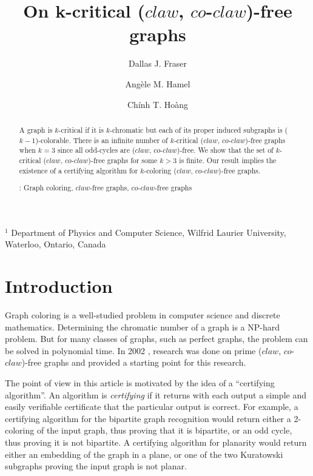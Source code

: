 \documentclass[12pt]{article}
\title{On k-critical ($claw$, $co$-$claw$)-free graphs}
\author{
  Dallas J. Fraser\inst{1}
  \and Ang\`ele M. Hamel\inst{1}
  \and Ch\'inh T. Ho\`ang\inst{1}
}
\def\inst#1{$^{#1}$}
\def\CCO{($claw$, $co$-$claw$)}
\begin{document}
\maketitle

\begin{center}
{\footnotesize

\inst{1} Department of Physics and Computer Science, Wilfrid Laurier
University, \\ Waterloo, Ontario, Canada}


\end{center}
%
\begin{abstract}
A graph is $k$-critical if it is $k$-chromatic but each of its proper
induced subgraphs is ($k-1$)-colorable. There is an infinite number of $k$-critical {\CCO}-free graphs when $k = 3$ since all odd-cycles are {\CCO}-free. We show that the set of $k$-critical {\CCO}-free graphs for some $k > 3$ is  finite. Our result implies the existence of a certifying algorithm for $k$-coloring {\CCO}-free graphs. 

: Graph coloring, $claw$-free graphs, $co$-$claw$-free graphs
\end{abstract}


\section{Introduction}\label{sec:intro}

Graph coloring is a well-studied problem in computer science and
discrete mathematics.  Determining the chromatic number of a graph
is a NP-hard problem.  But for many classes of graphs, such as
perfect graphs, the problem can be solved in polynomial time.
In 2002 \cite{BraFud2002}, research was done on  prime {\CCO}-free graphs and provided a starting point for this research.

The point of view in this article is motivated by the idea of a ``certifying algorithm''.  An algorithm is {\it certifying} if it returns with each output a simple and easily verifiable certificate that the particular output is correct.  For example, a certifying algorithm for the bipartite graph recognition would return either a 2-coloring of the input graph, thus proving that it is bipartite, or an odd cycle, thus proving it is not bipartite.  A certifying algorithm for planarity would return either an embedding of the graph in a plane, or one of the two Kuratowski subgraphs proving the input graph is not planar.
\end{document}
